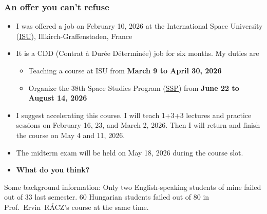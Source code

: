 \documentclass[t,aspectratio=169]{beamer}
\begin{document}
\begin{frame}%
\frametitle{An offer you can’t refuse}
\begin{itemize}
\setlength{\parskip}{0pt}
\setlength{\itemsep}{0pt}
\item I was offered a job on February 10, 2026 at the International Space University (\underline{\href{https://www.isunet.edu/}{ISU}}), Illkirch-Graffenstaden, France
\item It is a CDD (Contrat à Durée Déterminée) job for six months. My duties are
\begin{itemize}
\item Teaching a course at ISU from \textbf{March 9 to April 30, 2026}
\item Organize the 38th Space Studies Program (\underline{\href{https://www.isunet.edu/ssp/}{SSP}}) from \textbf{June 22 to August 14, 2026}
\end{itemize}
\item I suggest accelerating this course. I will teach 1+3+3 lectures and practice sessions on February 16, 23, and March 2, 2026. Then I will return and finish the course on May 4 and 11, 2026.
\item The midterm exam will be held on May 18, 2026 during the course slot.
\item \textbf{What do you think?}
\end{itemize}
Some background information: Only two English-speaking students of mine failed out of 33 last semester. 60 Hungarian students failed out of 80 in Prof.~Ervin~RÁCZ's course at the same time.
\end{frame}

\end{document}
